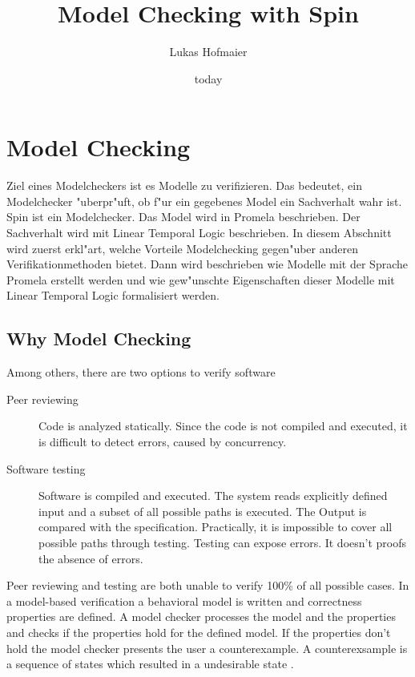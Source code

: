 \documentclass[11pt,twoside,a4paper]{article}
\begin{document}
\title{Model Checking with Spin}
\author{Lukas Hofmaier}
\date{today}
\maketitle

\tableofcontents

\section{Model Checking}
\label{sec:modelchecking}

Ziel eines Modelcheckers ist es Modelle zu verifizieren. Das bedeutet, ein Modelchecker "uberpr"uft, ob f"ur ein gegebenes Model ein Sachverhalt wahr ist. Spin ist ein Modelchecker. Das Model wird in Promela beschrieben. Der Sachverhalt wird mit Linear Temporal Logic beschrieben. In diesem Abschnitt wird zuerst erkl"art, welche Vorteile Modelchecking gegen"uber anderen Verifikationmethoden bietet. Dann wird beschrieben wie Modelle mit der Sprache Promela erstellt werden und wie gew"unschte Eigenschaften dieser Modelle mit Linear Temporal Logic formalisiert werden.

\subsection{Why Model Checking}
\label{sec:why}

Among others, there are two options to verify software
\begin{description}
\item[Peer reviewing] Code is analyzed statically. Since the code is not compiled and executed, it is difficult to detect errors, caused by concurrency.
\item[Software testing] Software is compiled and executed. The system reads explicitly defined input and a subset of all possible paths is executed. The Output is compared with the specification. Practically, it is impossible to cover all possible paths through testing. Testing can expose errors. It doesn't proofs the absence of errors.
\end{description}

Peer reviewing and testing are both unable to verify 100\% of all possible cases. In a model-based verification a behavioral model is written and correctness properties are defined. A model checker processes the model and the properties and checks if the properties hold for the defined model. If the properties don't hold the model checker presents the user a counterexample. A counterexsample is a sequence of states which resulted in a undesirable state \cite{baier08}.
\end{document}
